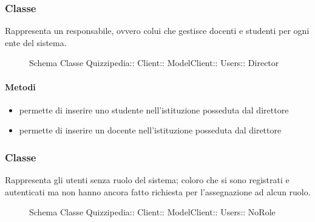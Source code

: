 \subsubsection{Classe }
Rappresenta un responsabile, ovvero colui che gestisce docenti e studenti per ogni ente del sistema.
\begin{figure}[H]
\centering
\noindent{}
\caption[Schema Classe Director]{Schema Classe Quizzipedia:: Client:: ModelClient:: Users:: Director}
\end{figure}
\paragraph{Metodi}
\begin{itemize}
\item {}
\newline
permette di inserire uno studente nell'istituzione posseduta dal direttore
\newline
\item {}
\newline
permette di inserire un docente nell'istituzione posseduta dal direttore
\newline
\end{itemize}
\subsubsection{Classe }
Rappresenta gli utenti senza ruolo del sistema; coloro che si sono registrati e autenticati ma non hanno ancora fatto richiesta per l'assegnazione ad alcun ruolo.
\begin{figure}[H]
\centering
\noindent{}
\caption[Schema Classe NoRole]{Schema Classe Quizzipedia:: Client:: ModelClient:: Users:: NoRole}
\end{figure}
